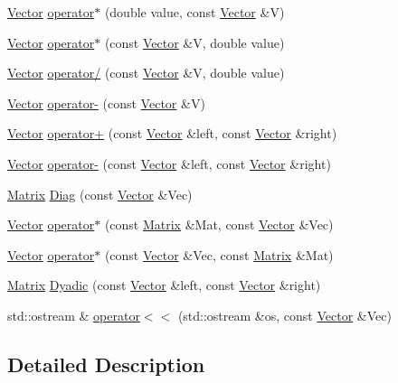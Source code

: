 \begin{DoxyCompactItemize}
\item 
\hyperlink{classVector}{Vector} \hyperlink{classVector_a2b39254826a094bcd2a6b38e7d63c84e}{operator$\ast$} (double value, const \hyperlink{classVector}{Vector} \&V)
\item 
\hyperlink{classVector}{Vector} \hyperlink{classVector_a0b4063a22d4358e908150122da370573}{operator$\ast$} (const \hyperlink{classVector}{Vector} \&V, double value)
\item 
\hyperlink{classVector}{Vector} \hyperlink{classVector_a9839d9f3dd1afc5da9f1a5757587470c}{operator/} (const \hyperlink{classVector}{Vector} \&V, double value)
\item 
\hyperlink{classVector}{Vector} \hyperlink{classVector_ac81e944680e8ed0fe06c1394f5969b0e}{operator-\/} (const \hyperlink{classVector}{Vector} \&V)
\item 
\hyperlink{classVector}{Vector} \hyperlink{classVector_a4dba5586909542d9eb8baca2e2968178}{operator+} (const \hyperlink{classVector}{Vector} \&left, const \hyperlink{classVector}{Vector} \&right)
\item 
\hyperlink{classVector}{Vector} \hyperlink{classVector_a37e080fb6b5cd0fbb3e8b050b1f0e9d3}{operator-\/} (const \hyperlink{classVector}{Vector} \&left, const \hyperlink{classVector}{Vector} \&right)
\item 
\hyperlink{classMatrix}{Matrix} \hyperlink{classVector_af7d7bb183b22c5c942a8afdadc433bc2}{Diag} (const \hyperlink{classVector}{Vector} \&Vec)
\item 
\hyperlink{classVector}{Vector} \hyperlink{classVector_ad239de62f336223aebc6a42debc44883}{operator$\ast$} (const \hyperlink{classMatrix}{Matrix} \&Mat, const \hyperlink{classVector}{Vector} \&Vec)
\item 
\hyperlink{classVector}{Vector} \hyperlink{classVector_adf558aeff97481fccb373a50dcba1c2d}{operator$\ast$} (const \hyperlink{classVector}{Vector} \&Vec, const \hyperlink{classMatrix}{Matrix} \&Mat)
\item 
\hyperlink{classMatrix}{Matrix} \hyperlink{classVector_a4c5b7e42a648b06a906407b0155e3342}{Dyadic} (const \hyperlink{classVector}{Vector} \&left, const \hyperlink{classVector}{Vector} \&right)
\item 
std\-::ostream \& \hyperlink{classVector_a548185f939c2efbe94ff701c68b4ba50}{operator$<$$<$} (std\-::ostream \&os, const \hyperlink{classVector}{Vector} \&Vec)
\end{DoxyCompactItemize}


\subsection{Detailed Description}


